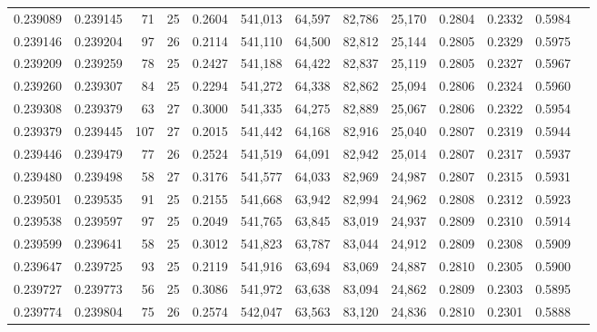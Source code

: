 \begin{tabular}{rrrrrrrrrrrrr}
0.239089 & 0.239145 &  71 &  25 &                                     0.2604 & 541,013 &  64,597 &  82,786 &  25,170 & 0.2804 & 0.2332 & 0.5984 \\
0.239146 & 0.239204 &  97 &  26 &                                     0.2114 & 541,110 &  64,500 &  82,812 &  25,144 & 0.2805 & 0.2329 & 0.5975 \\
0.239209 & 0.239259 &  78 &  25 &                                     0.2427 & 541,188 &  64,422 &  82,837 &  25,119 & 0.2805 & 0.2327 & 0.5967 \\
0.239260 & 0.239307 &  84 &  25 &                                     0.2294 & 541,272 &  64,338 &  82,862 &  25,094 & 0.2806 & 0.2324 & 0.5960 \\
0.239308 & 0.239379 &  63 &  27 &                                     0.3000 & 541,335 &  64,275 &  82,889 &  25,067 & 0.2806 & 0.2322 & 0.5954 \\
0.239379 & 0.239445 & 107 &  27 &                                     0.2015 & 541,442 &  64,168 &  82,916 &  25,040 & 0.2807 & 0.2319 & 0.5944 \\
0.239446 & 0.239479 &  77 &  26 &                                     0.2524 & 541,519 &  64,091 &  82,942 &  25,014 & 0.2807 & 0.2317 & 0.5937 \\
0.239480 & 0.239498 &  58 &  27 &                                     0.3176 & 541,577 &  64,033 &  82,969 &  24,987 & 0.2807 & 0.2315 & 0.5931 \\
0.239501 & 0.239535 &  91 &  25 &                                     0.2155 & 541,668 &  63,942 &  82,994 &  24,962 & 0.2808 & 0.2312 & 0.5923 \\
0.239538 & 0.239597 &  97 &  25 &                                     0.2049 & 541,765 &  63,845 &  83,019 &  24,937 & 0.2809 & 0.2310 & 0.5914 \\
0.239599 & 0.239641 &  58 &  25 &                                     0.3012 & 541,823 &  63,787 &  83,044 &  24,912 & 0.2809 & 0.2308 & 0.5909 \\
0.239647 & 0.239725 &  93 &  25 &                                     0.2119 & 541,916 &  63,694 &  83,069 &  24,887 & 0.2810 & 0.2305 & 0.5900 \\
0.239727 & 0.239773 &  56 &  25 &                                     0.3086 & 541,972 &  63,638 &  83,094 &  24,862 & 0.2809 & 0.2303 & 0.5895 \\
0.239774 & 0.239804 &  75 &  26 &                                     0.2574 & 542,047 &  63,563 &  83,120 &  24,836 & 0.2810 & 0.2301 & 0.5888 \\

\end{tabular}
